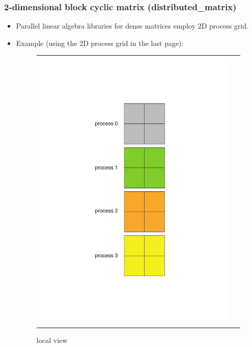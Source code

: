 \begin{frame}
  \frametitle{2-dimensional block cyclic matrix (distributed_matrix)}
  \begin{itemize}
  \item Parallel linear algebra libraries for dense matrices employ 2D process grid.
  \item Example (using the 2D process grid in the last page):
  \begin{figure}[htbp]
\begin{tabular}{cc}
\begin{minipage}{0.4\hsize}
\begin{center}
\includegraphics[height=0.45\textheight]{figure/local-view.pdf}
\caption{local view}
\label{fig:local-view}
\end{center}
\end{minipage}
\begin{minipage}{0.4\hsize}

\end{minipage}
\end{tabular}
\end{figure}
\end{itemize}
\end{frame}

